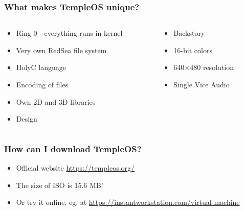 \documentclass{beamer}
\begin{document}
	\begin{frame}
		\frametitle{What makes TempleOS unique?}
		\begin{columns}
			\begin{column}{0.5\textwidth} %
				\begin{itemize}
					\item Ring 0 - everything runs in kernel

					\item Very own RedSea file system

					\item HolyC language

					\item Encoding of files

					\item Own 2D and 3D libraries

					\item Design
				\end{itemize}
			\end{column}

			\begin{column}{0.5\textwidth} %
				\begin{itemize}
					\item Backstory

					\item 16-bit colors

					\item 640$\times$480 resolution

					\item Single Vice Audio
				\end{itemize}
			\end{column}
		\end{columns}
	\end{frame}

	\begin{frame}
		\frametitle{How can I download TempleOS?}
		\begin{itemize}
			\item Official website \url{https://templeos.org/}

			\item The size of ISO is 15.6 MB!

			\item Or try it online, eg. at \url{https://instantworkstation.com/virtual-machine}
		\end{itemize}
	\end{frame}
\end{document}
